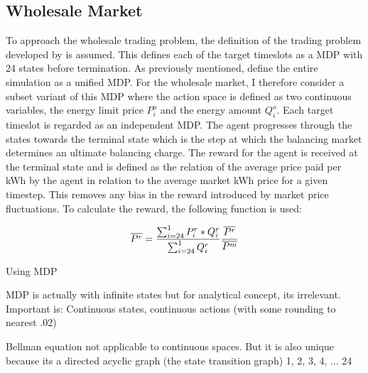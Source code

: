 {%

\subsection{Wholesale Market}
\label{sub:wholesale_market}

To approach the wholesale trading problem, the definition of the trading problem developed by
\citet{tactexurieli2016mdp} is assumed. This defines each of the target timeslots as a \ac{MDP} with 24 states before
termination. As previously mentioned, \citet{tactexurieli2016mdp} define the entire simulation as a unified \ac{MDP}.
For the wholesale market, I therefore consider a subset variant of this \ac{MDP} where the action space is defined as
two continuous variables, the energy limit price $P^o_i$ and the energy amount $Q^o_i$. Each target timeslot is regarded as
an independent \ac{MDP}. The agent progresses through the states towards the terminal state which is the step at which
the balancing market determines an ultimate balancing charge. The reward for the agent is received at the terminal state
and is defined as the relation of the average price paid per kWh by the agent in relation to the average market kWh
price for a given timestep. This removes any bias in the reward introduced by market price fluctuations. To calculate
the reward, the following function is used:

\begin{equation}
	\label{eq:Reward function for agent in wholesale trading environment}
\overline{P^{r}} =\frac{\sum ^{1}_{i=24} P^{r}_{i} *Q^{r}_{i}}{\sum ^{1}_{i=24} Q^{r}_{i}}
\\
\frac{\overline{P^{r}}}{\overline{P^{m}}}


\end{equation}

Using \ac {MDP} 

\ac {MDP} is actually with infinite states but for analytical concept, its irrelevant. Important is: Continuous states,
continuous actions (with some rounding to nearest .02)

Bellman equation not applicable to continuous spaces. But it is also unique because its a directed acyclic graph (the
state transition graph) 1, 2, 3, 4, ... 24

}
